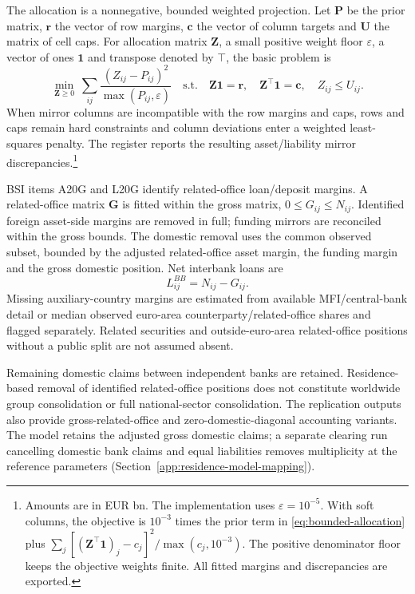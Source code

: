 The allocation is a nonnegative, bounded weighted projection. Let $\mathbf{P}$ be the prior matrix, $\mathbf{r}$ the vector of row margins, $\mathbf{c}$ the vector of column targets and $\mathbf{U}$ the matrix of cell caps. For allocation matrix $\mathbf{Z}$, a small positive weight floor $\varepsilon$, a vector of ones $\mathbf1$ and transpose denoted by $\top$, the basic problem is
\begin{equation}
 \min_{\mathbf{Z}\geq0}\ \sum_{ij}\frac{(Z_{ij}-P_{ij})^2}{\max(P_{ij},\varepsilon)}
 \quad\text{s.t.}\quad
 \mathbf{Z}\mathbf1=\mathbf{r},\quad \mathbf{Z}^\top\mathbf1=\mathbf{c},\quad Z_{ij}\leq U_{ij}.
 \label{eq:bounded-allocation}
\end{equation}
When mirror columns are incompatible with the row margins and caps, rows and caps remain hard constraints and column deviations enter a weighted least-squares penalty. The register reports the resulting asset/liability mirror discrepancies.\footnote{Amounts are in EUR bn. The implementation uses $\varepsilon=10^{-5}$. With soft columns, the objective is $10^{-3}$ times the prior term in \eqref{eq:bounded-allocation} plus $\sum_j[(\mathbf{Z}^\top\mathbf1)_j-c_j]^2/\max(c_j,10^{-3})$. The positive denominator floor keeps the objective weights finite. All fitted margins and discrepancies are exported.}

BSI items A20G and L20G identify related-office loan/deposit margins. A related-office matrix $\mathbf{G}$ is fitted within the gross matrix, $0\leq G_{ij}\leq N_{ij}$. Identified foreign asset-side margins are removed in full; funding mirrors are reconciled within the gross bounds. The domestic removal uses the common observed subset, bounded by the adjusted related-office asset margin, the funding margin and the gross domestic position. Net interbank loans are
\[
 L_{ij}^{BB}=N_{ij}-G_{ij}.
\]
Missing auxiliary-country margins are estimated from available MFI/central-bank detail or median observed euro-area counterparty/related-office shares and flagged separately. Related securities and outside-euro-area related-office positions without a public split are not assumed absent.

Remaining domestic claims between independent banks are retained. Residence-based removal of identified related-office positions does not constitute worldwide group consolidation or full national-sector consolidation. The replication outputs also provide gross-related-office and zero-domestic-diagonal accounting variants. The model retains the adjusted gross domestic claims; a separate clearing run cancelling domestic bank claims and equal liabilities removes multiplicity at the reference parameters (Section~\ref{app:residence-model-mapping}).

